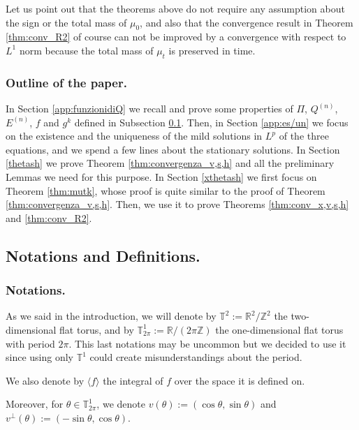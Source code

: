 \documentclass[a4paper,10pt,reqno]{amsart}
\numberwithin{equation}{subsection}
\numberwithin{figure}{subsection}
\begin{document}
Let us point out that the theorems above do not require any assumption about the sign or the total mass of $\mu_0$, and also that the convergence result in Theorem \ref{thm:conv_R2} of course can not be improved by a convergence with respect to $L^1$ norm because the total mass of $\mu_t$ is preserved in time. 
\newline
\subsubsection{Outline of the paper.} In Section \ref{app:funzionidiQ} we recall and prove some properties of $\Pi$, $Q^{(n)}$, $E^{(n)}$, $f$ and $g^k$ defined in Subsection \ref{sez:defnot}. Then, in Section \ref{app:es/un} we focus on the existence and the uniqueness of the mild solutions in $L^p$ of the three equations, and we spend a few lines about the stationary solutions. In Section \ref{thetash} we prove Theorem \ref{thm:convergenza_v,s,h} and all the preliminary Lemmas we need for this purpose. In Section \ref{xthetash} we first focus on Theorem \ref{thm:mutk}, whose proof is quite similar to the proof of Theorem \ref{thm:convergenza_v,s,h}. Then, we use it to prove Theorems \ref{thm:conv_x,v,s,h} and \ref{thm:conv_R2}.

\subsection{Notations and Definitions.}\label{sez:defnot}
\subsubsection{Notations.} As we said in the introduction, we will denote by $\mathbb{T}^2:=\mathbb{R}^2/\mathbb{Z}^2$ the two-dimensional flat torus, and by $\mathbb{T}^1_{2\pi}:=\mathbb{R}/(2\pi \mathbb{Z})$ the one-dimensional flat torus with period $2\pi$. This last notations may be uncommon but we decided to use it since using only $\mathbb{T}^1$ could create misunderstandings about the period.

We also denote by $\langle f\rangle$ the integral of $f$ over the space it is defined on.

Moreover,  for $\theta\in\mathbb{T}^1_{2\pi}$, we denote $v(\theta):=(\cos\theta,\sin\theta)$ and $v^{\perp}(\theta):=(-\sin\theta,\cos\theta)$.
\newline
\end{document}

